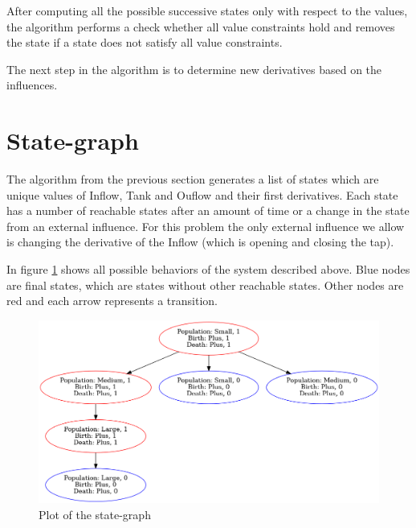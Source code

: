 \documentclass[a4paper]{article}
\begin{document}
After computing all the possible successive states only with respect to the values, the algorithm performs a check whether all value constraints hold and removes the state if a state does not satisfy all value constraints.

The next step in the algorithm is to determine new derivatives based on the influences.
\begin{algorithm}

\caption{}
\label{alg:propogating_influences}
\end{algorithm}

\section{State-graph}
The algorithm from the previous section generates a list of states which are unique values of Inflow, Tank and Ouflow and their first derivatives. Each state has a number of reachable states after an amount of time or a change in the state from an external influence. For this problem the only external influence we allow is changing the derivative of the Inflow (which is opening and closing the tap).

In figure \ref{state-graph} shows all possible behaviors of the system described above. Blue nodes are final states, which are states without other reachable states. Other nodes are red and each arrow represents a transition.

\begin{figure}[H]\label{state-graph}
\centering
\includegraphics[width=\textwidth]{result.png}
\caption{Plot of the state-graph}
\end{figure}
\end{document}
